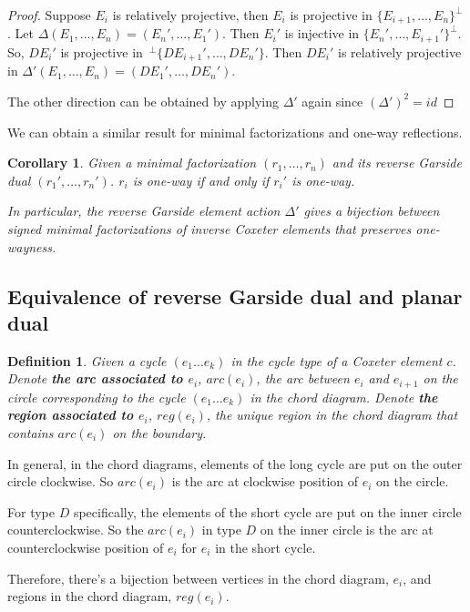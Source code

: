 \documentclass[11pt]{amsart}
\newtheorem{defi}[thm]{Definition}%
\newtheorem{cor}[thm]{Corollary}%
\begin{document}
\begin{proof}
    Suppose $E_i$ is relatively projective, then $E_i$ is projective in $\{E_{i+1},\dots,E_n\}^\perp$. Let 
    $\Delta(E_1,\dots,E_n)=(E_n',\dots,E_1')$. Then $E_i'$ is injective in $\{E_n',\dots,E_{i+1}'\}^\perp$. So, $DE_i'$ is projective in $\,^\perp\{DE_{i+1}',\dots,DE_n'\}$. Then $DE_i'$ is relatively projective in $\Delta'(E_1,\dots,E_n)=(DE_1',\dots,DE_n')$.
    
    The other direction can be obtained by applying $\Delta'$ again since $(\Delta')^2=id$
\end{proof}

We can obtain a similar result for minimal factorizations and one-way reflections.

\begin{cor}\label{thm B}
    Given a minimal factorization $(r_1,\dots,r_n)$ and its reverse Garside dual $(r_1',\dots,r_n')$. $r_i$ is one-way if and only if $r_i'$ is one-way.

    In particular, the reverse Garside element action $\Delta'$ gives a bijection between signed minimal factorizations of inverse Coxeter elements that preserves one-wayness. 
\end{cor}

\subsection{Equivalence of reverse Garside dual and planar dual}

\begin{defi}
    Given a cycle $(e_1\dots e_k)$ in the cycle type of a Coxeter element $c$. Denote \textbf{the arc associated to $e_i$}, $arc(e_i)$, the arc between $e_i$ and $e_{i+1}$ on the circle corresponding to the cycle $(e_1 \dots e_k)$ in the chord diagram. Denote \textbf{the region associated to $e_i$}, $reg(e_i)$, the unique region in the chord diagram that contains $arc(e_i)$ on the boundary.
\end{defi}

In general, in the chord diagrams, elements of the long cycle are put on the outer circle clockwise. So $arc(e_i)$ is the arc at clockwise position of $e_i$ on the circle.

For type $D$ specifically, the elements of the short cycle are put on the inner circle counterclockwise. So the $arc(e_i)$ in type $D$ on the inner circle is the arc at counterclockwise position of $e_i$ for $e_i$ in the short cycle.

Therefore, there's a bijection between vertices in the chord diagram, $e_i$, and regions in the chord diagram, $reg(e_i)$.
\end{document}
